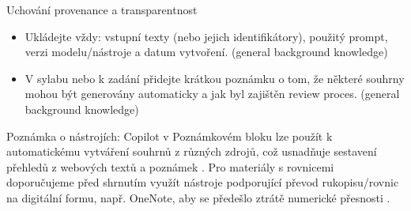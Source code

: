 Uchování provenance a transparentnost
\begin{itemize}
  \item Ukládejte vždy: vstupní texty (nebo jejich identifikátory), použitý prompt, verzi modelu/nástroje a datum vytvoření. (general background knowledge)
  \item V sylabu nebo k zadání přidejte krátkou poznámku o tom, že některé souhrny mohou být generovány automaticky a jak byl zajištěn review proces. (general background knowledge)
\end{itemize}

Poznámka o nástrojích: Copilot v Poznámkovém bloku lze použít k automatickému vytváření souhrnů z různých zdrojů, což usnadňuje sestavení přehledů z webových textů a poznámek \cite{kb_ai_101_tipu_pdf_04e4a115_page_14_1}. Pro materiály s rovnicemi doporučujeme před shrnutím využít nástroje podporující převod rukopisu/rovnic na digitální formu, např. OneNote, aby se předešlo ztrátě numerické přesnosti \cite{kb_ai_101_tipu_pdf_04e4a115_page_8_1}.